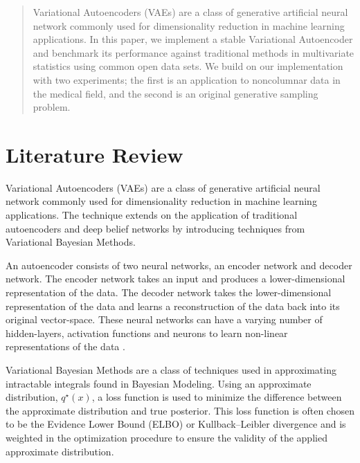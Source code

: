 \documentclass[12pt]{article}
\begin{document}


\begin{abstract}


\noindent Variational Autoencoders (VAEs) are a class of generative artificial neural network commonly used for dimensionality reduction in machine learning applications.  In this paper, we implement a stable Variational Autoencoder and benchmark its performance against traditional methods in multivariate statistics using common open data sets. We build on our implementation with two experiments; the first is an application to noncolumnar data in the medical field, and the second is an original generative sampling problem. 

\end{abstract}


\newpage
\tableofcontents
\pagebreak

\section{Literature Review}
Variational Autoencoders (VAEs) are a class of generative artificial neural network commonly used for dimensionality reduction in machine learning applications.  The technique extends on the application of traditional autoencoders and deep belief networks by introducing techniques from Variational Bayesian Methods.  

An autoencoder consists of two neural networks, an encoder network and decoder network. The encoder network takes an input and produces a lower-dimensional representation of the data. The decoder network takes the lower-dimensional representation of the data and learns a reconstruction of the data back into its original vector-space. These neural networks can have a varying number of hidden-layers, activation functions and neurons to learn non-linear representations of the data \citep{Bengio2007, Bengio2013}.  

Variational Bayesian Methods are a class of techniques used in approximating intractable integrals found in Bayesian Modeling.  Using an approximate distribution, $q^\star(x)$, a loss function is used to minimize the difference between the approximate distribution and true posterior.  This loss function is often chosen to be the Evidence Lower Bound (ELBO) or Kullback–Leibler divergence and is weighted in the optimization procedure to ensure the validity of the applied approximate distribution.   
\end{document}
